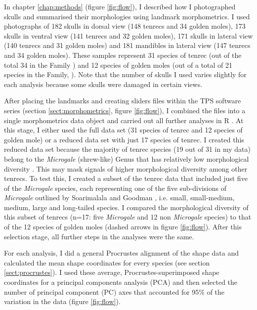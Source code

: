 	In chapter \ref{chap:methods} (figure \ref{fig:flow}), I described how I photographed skulls and summarised their morphologies using landmark morphometrics. I used photographs of 182 skulls in dorsal view (148 tenrecs and 34 golden moles), 173 skulls in ventral view (141 tenrecs and 32 golden moles), 171 skulls in lateral view (140 tenrecs and 31 golden moles) and 181 mandibles in lateral view (147 tenrecs and 34 golden moles). These samples represent 31 species of tenrec (out of the total 34 in the Family \citep{Olson2013}) and 12 species of golden moles (out of a total of 21 species in the Family, \citep{Asher2010}). Note that the number of skulls I used varies slightly for each analysis because some skulls were damaged in certain views.
	

	After placing the landmarks and creating sliders files within the TPS software series (section \ref{sect:morphometrics}, figure \ref{fig:flow}), I combined the files into a single morphometrics data object and carried out all further analyses in R \citep{Team2014}. At this stage, I either used the full data set (31 species of tenrec and 12 species of golden mole) or a reduced data set with just 17 species of tenrec. I created this reduced data set because the majority of tenrec species (19 out of 31 in my data) belong to the \textit{Microgale} (shrew-like) Genus that has relatively low morphological diversity \citep{Soarimalala2011, Jenkins2003}. This may mask signals of higher morphological diversity among other tenrecs. To test this, I created a subset of the tenrec data that included just five of the \textit{Microgale} species, each representing one of the five sub-divisions of \textit{Microgale} outlined by Soarimalala and Goodman \citeyearpar{Soarimalala2011}, i.e. small, small-medium, medium, large and long-tailed species. I compared the morphological diversity of this subset of tenrecs (n=17: five \textit{Microgale} and 12 non \textit{Microgale} species) to that of the 12 species of golden moles (dashed arrows in figure \ref{fig:flow}). After this selection stage, all further steps in the analyses were the same.
		
	For each analysis, I did a general Procrustes alignment of the shape data and calculated the mean shape coordinates for every species (see section \ref{sect:procrustes}). I used these average, Procrustes-superimposed shape coordinates for a principal components analysis (PCA) and then selected the number of principal component (PC) axes that accounted for 95\% of the variation in the data (figure \ref{fig:flow}).
	

